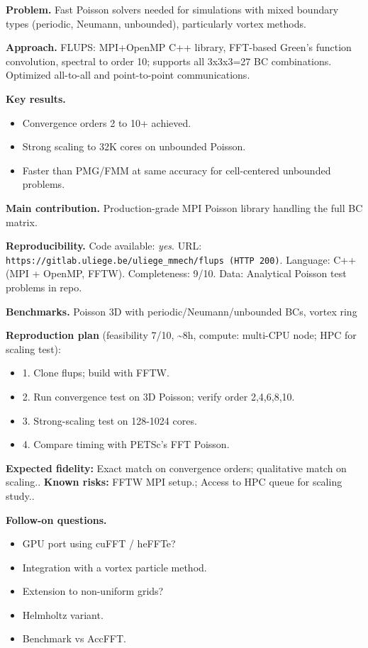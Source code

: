 \documentclass[10pt,letterpaper]{article}
\begin{document}
\textbf{Problem.} Fast Poisson solvers needed for simulations with mixed boundary types (periodic, Neumann, unbounded), particularly vortex methods.

\textbf{Approach.} FLUPS: MPI+OpenMP C++ library, FFT-based Green's function convolution, spectral to order 10; supports all 3x3x3=27 BC combinations. Optimized all-to-all and point-to-point communications.

\textbf{Key results.}
\begin{itemize}
\item Convergence orders 2 to 10+ achieved.
\item Strong scaling to 32K cores on unbounded Poisson.
\item Faster than PMG/FMM at same accuracy for cell-centered unbounded problems.
\end{itemize}

\textbf{Main contribution.} Production-grade MPI Poisson library handling the full BC matrix.

\textbf{Reproducibility.} Code available: \emph{yes}. URL: \texttt{https://gitlab.uliege.be/uliege\_mmech/flups (HTTP 200)}. Language: C++ (MPI + OpenMP, FFTW). Completeness: 9/10. Data: Analytical Poisson test problems in repo.

\textbf{Benchmarks.} Poisson 3D with periodic/Neumann/unbounded BCs, vortex ring

\textbf{Reproduction plan} (feasibility 7/10, \textasciitilde8h, compute: multi-CPU node; HPC for scaling test):
\begin{itemize}
\item 1. Clone flups; build with FFTW.
\item 2. Run convergence test on 3D Poisson; verify order 2,4,6,8,10.
\item 3. Strong-scaling test on 128-1024 cores.
\item 4. Compare timing with PETSc's FFT Poisson.
\end{itemize}
\textbf{Expected fidelity:} Exact match on convergence orders; qualitative match on scaling.. \textbf{Known risks:} FFTW MPI setup.; Access to HPC queue for scaling study..

\textbf{Follow-on questions.}
\begin{itemize}
\item GPU port using cuFFT / heFFTe?
\item Integration with a vortex particle method.
\item Extension to non-uniform grids?
\item Helmholtz variant.
\item Benchmark vs AccFFT.
\end{itemize}
\end{document}
